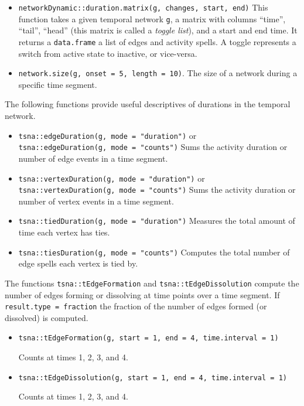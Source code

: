 \documentclass[
]{article}
\begin{document}
\begin{itemize}
\item
  \texttt{networkDynamic::duration.matrix(g,\ changes,\ start,\ end)}
  This function takes a given temporal network \texttt{g}, a matrix with
  columns ``time'', ``tail'', ``head'' (this matrix is called a
  \emph{toggle list}), and a start and end time. It returns a
  \texttt{data.frame} a list of edges and activity spells. A toggle
  represents a switch from active state to inactive, or vice-versa.
\item
  \texttt{network.size(g,\ onset\ =\ 5,\ length\ =\ 10)}. The size of a
  network during a specific time segment.
\end{itemize}

The following functions provide useful descriptives of durations in the
temporal network.

\begin{itemize}
\item
  \texttt{tsna::edgeDuration(g,\ mode\ =\ "duration")} or
  \texttt{tsna::edgeDuration(g,\ mode\ =\ "counts")} Sums the activity
  duration or number of edge events in a time segment.
\item
  \texttt{tsna::vertexDuration(g,\ mode\ =\ "duration")} or
  \texttt{tsna::vertexDuration(g,\ mode\ =\ "counts")} Sums the activity
  duration or number of vertex events in a time segment.
\item
  \texttt{tsna::tiedDuration(g,\ mode\ =\ "duration")} Measures the
  total amount of time each vertex has ties.
\item
  \texttt{tsna::tiesDuration(g,\ mode\ =\ "counts")} Computes the total
  number of edge spells each vertex is tied by.
\end{itemize}

The functions \texttt{tsna::tEdgeFormation} and
\texttt{tsna::tEdgeDissolution} compute the number of edges forming or
dissolving at time points over a time segment. If
\texttt{result.type\ =\ \textquotesingle{}fraction\textquotesingle{}}
the fraction of the number of edges formed (or dissolved) is computed.

\begin{itemize}
\item
  \texttt{tsna::tEdgeFormation(g,\ start\ =\ 1,\ end\ =\ 4,\ time.interval\ =\ 1)}

  Counts at times 1, 2, 3, and 4.
\item
  \texttt{tsna::tEdgeDissolution(g,\ start\ =\ 1,\ end\ =\ 4,\ time.interval\ =\ 1)}

  Counts at times 1, 2, 3, and 4.
\end{itemize}
\end{document}
